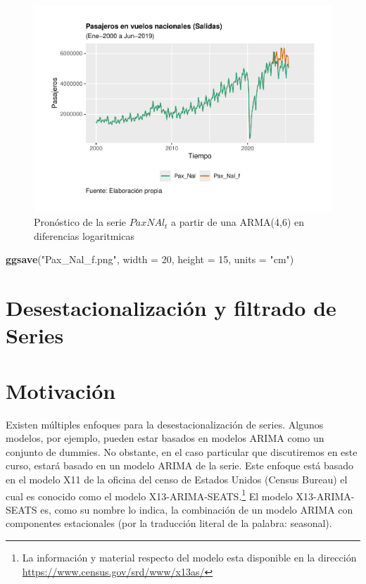 \documentclass[
]{book}
\newenvironment{Shaded}{\begin{snugshade}}{\end{snugshade}}
\newcommand{\AttributeTok}[1]{\textcolor[rgb]{0.13,0.29,0.53}{#1}}
\newcommand{\DecValTok}[1]{\textcolor[rgb]{0.00,0.00,0.81}{#1}}
\newcommand{\FunctionTok}[1]{\textcolor[rgb]{0.13,0.29,0.53}{\textbf{#1}}}
\newcommand{\NormalTok}[1]{#1}
\newcommand{\StringTok}[1]{\textcolor[rgb]{0.31,0.60,0.02}{#1}}
\begin{document}
\begin{figure}

{\centering \includegraphics{Notas-Series-Tiempo_files/figure-latex/fig417-1} 

}

\caption{Pronóstico de la serie $PaxNAl_t$ a partir de una ARMA(4,6) en diferencias logaritmicas}\label{fig:fig417}
\end{figure}

\begin{Shaded}
\begin{Highlighting}[]
\FunctionTok{ggsave}\NormalTok{(}\StringTok{"Pax\_Nal\_f.png"}\NormalTok{, }\AttributeTok{width =} \DecValTok{20}\NormalTok{, }\AttributeTok{height =} \DecValTok{15}\NormalTok{, }\AttributeTok{units =} \StringTok{"cm"}\NormalTok{)}
\end{Highlighting}
\end{Shaded}

\hypertarget{desestacionalizaciuxf3n-y-filtrado-de-series}{%
\section{Desestacionalización y filtrado de Series}\label{desestacionalizaciuxf3n-y-filtrado-de-series}}

\hypertarget{motivaciuxf3n}{%
\section{Motivación}\label{motivaciuxf3n}}

Existen múltiples enfoques para la desestacionalización de series. Algunos modelos, por ejemplo, pueden estar basados en modelos ARIMA como un conjunto de dummies. No obstante, en el caso particular que discutiremos en este curso, estará basado en un modelo ARIMA de la serie. Este enfoque está basado en el modelo X11 de la oficina del censo de Estados Unidos (Census Bureau) el cual es conocido como el modelo X13-ARIMA-SEATS.\footnote{ La información y material respecto del modelo esta disponible en la dirección \url{https://www.census.gov/srd/www/x13as/}} El modelo X13-ARIMA-SEATS es, como su nombre lo indica, la combinación de un modelo ARIMA con componentes estacionales (por la traducción literal de la palabra: seasonal).
\end{document}
